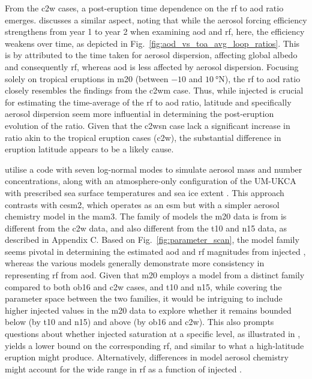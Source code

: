 \documentclass{ametsocV6.1}
\newcommand{\iso}[1][i]{{#1}njected \ce{SO2}}
\begin{document}
From the \gls{c2w} cases, a post-eruption time dependence on the \gls{rf} to \gls{aod}
ratio emerges. \citet{marshall2020} discusses a similar aspect, noting that while the
aerosol forcing efficiency strengthens from year 1 to year 2 when examining \gls{aod}
and \gls{rf}, here, the efficiency weakens over time, as depicted in
Fig.~\ref{fig:aod_vs_toa_avg_loop_ratios}. This is by \citet{marshall2020} attributed to
the time taken for aerosol dispersion, affecting global albedo and consequently
\gls{rf}, whereas \gls{aod} is less affected by aerosol dispersion. Focusing solely on
tropical eruptions in \gls{m20} (between \(-10\) and \(\SI{10}{\degree\mathrm{N}}\)),
the \gls{rf} to \gls{aod} ratio closely resembles the findings from the \gls{c2wm} case.
Thus, while \iso{} is crucial for estimating the time-average of the \gls{rf} to
\gls{aod} ratio, latitude and specifically aerosol dispersion seem more influential in
determining the post-eruption evolution of the ratio. Given that the \gls{c2wsn} case
lack a significant increase in ratio akin to the tropical eruption cases (\gls{c2w}),
the substantial difference in eruption latitude appears to be a likely cause.

\citet{marshall2019, marshall2020, marshall2021} utilise a code with seven log-normal
modes to simulate aerosol mass and number concentrations, along with an atmosphere-only
configuration of the UM-UKCA with prescribed sea surface temperatures and sea ice extent
\citep{marshall2019}. This approach contrasts with \gls{cesm2}, which operates as an
\gls{esm} but with a simpler aerosol chemistry model in the \gls{mam3}. The family of
models the \gls{m20} data is from is different from the \gls{c2w} data, and also
different from the \gls{t10} and \gls{n15} data, as described in Appendix C. Based on
Fig.~\ref{fig:parameter_scan}, the model family seems pivotal in determining the
estimated \gls{aod} and \gls{rf} magnitudes from \iso{}, whereas the various models
generally demonstrate more consistency in representing \gls{rf} from \gls{aod}. Given
that \gls{m20} employs a model from a distinct family compared to both \gls{ob16} and
\gls{c2w} cases, and \gls{t10} and \gls{n15}, while covering the parameter space between
the two families, it would be intriguing to include higher \iso{} values in the
\gls{m20} data to explore whether it remains bounded below (by \gls{t10} and \gls{n15})
and above (by \gls{ob16} and \gls{c2w}). This also prompts questions about whether
\iso{} saturation at a specific level, as illustrated in \citet{niemeier2015}, yields a
lower bound on the corresponding \gls{rf}, and similar to what a high-latitude eruption
might produce. Alternatively, differences in model aerosol chemistry might account for
the wide range in \gls{rf} as a function of \iso{}.
\end{document}
